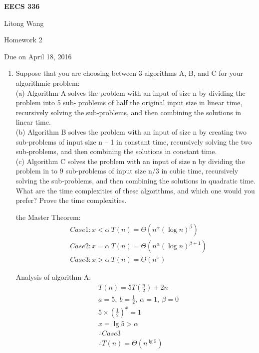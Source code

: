 \documentclass[12pt,letterpaper]{article}
\begin{document}
\centerline{\bf EECS 336}

\medskip
\centerline{Litong Wang}
\centerline{Homework 2}
\centerline{Due on April 18, 2016}
\bigskip


\begin{enumerate}

\item %

Suppose that you are choosing between 3 algorithms A, B, and C for your algorithmic problem: \\

(a) Algorithm A solves the problem with an input of size n by dividing the problem into 5 sub‐ problems of half the original input size in linear time, recursively solving the sub‐problems, and then combining the solutions in linear time. \\

(b) Algorithm B solves the problem with an input of size n by creating two sub‐problems of input size n – 1 in constant time, recursively solving the two sub‐problems, and then combining the solutions in constant time. \\

(c) Algorithm C solves the problem with an input of size n by dividing the problem in to 9 sub‐problems of input size n/3 in cubic time, recursively solving the sub‐problems, and then combining the solutions in quadratic time. \\

What are the time complexities of these algorithms, and which one would you prefer? Prove the time complexities.

the Master Theorem: \\
\begin{align*}
& Case 1: x < \alpha \ T(n) = \Theta(n^{\alpha}(\log n)^{\beta}) \\
& Case 2: x = \alpha \ T(n) = \Theta(n^{\alpha}(\log n)^{\beta + 1}) \\
& Case 3: x > \alpha \ T(n) = \Theta(n^x)
\end{align*}

Analysis of algorithm A: \\
\begin{align*}
& T(n) = 5 T(\frac{n}{2}) + 2n \\
& a = 5, \ b = \frac{1}{2}, \ \alpha = 1, \ \beta = 0 \\
& 5 \times (\frac{1}{2})^x = 1 \\
& x = \lg 5 > \alpha \\
& \therefore Case 3 \\
& \therefore T(n) = \Theta(n^{\lg 5})
\end{align*}


\end{enumerate}
\end{document}
